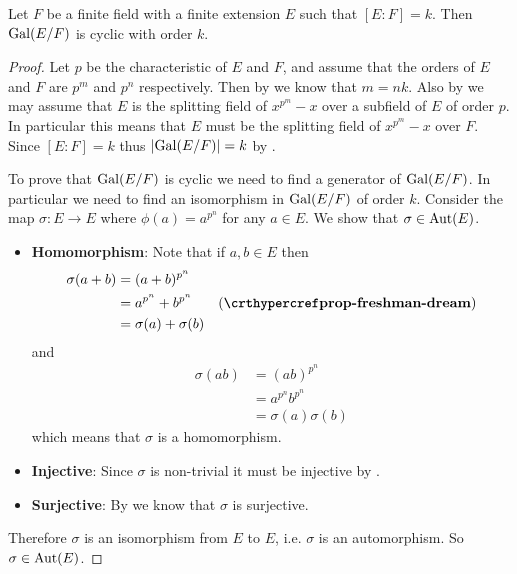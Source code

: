 \begin{corollary}
    Let $F$ be a finite field with a finite extension $E$ such that $[E:F] = k$. Then $\mathrm{Gal}(E/F)$ is cyclic with order $k$.
\end{corollary}
\begin{proof}
    Let $p$ be the characteristic of $E$ and $F$, and assume that the orders of $E$ and $F$ are $p^m$ and $p^n$ respectively. Then by  we know that $m = nk$. Also by  we may assume that $E$ is the splitting field of $x^{p^m} - x$ over a subfield of $E$ of order $p$. In particular this means that $E$ must be the splitting field of $x^{p^m} - x$ over $F$. Since $[E:F] = k$ thus $|\mathrm{Gal}(E/F)| = k$ by .

    To prove that $\mathrm{Gal}(E/F)$ is cyclic we need to find a generator of $\mathrm{Gal}(E/F)$. In particular we need to find an isomorphism in $\mathrm{Gal}(E/F)$ of order $k$. Consider the map $\sigma: E \to E$ where $\phi(a) = a^{p^n}$ for any $a \in E$. We show that $\sigma \in \mathrm{Aut}(E)$.
    \begin{itemize}
        \item \textbf{Homomorphism}: Note that if $a, b \in E$ then
        \begin{align*}
            \sigma(a+b) &= (a+b)^{p^n}\\
            &= a^{p^n} + b^{p^n} & (\myref{prop-freshman-dream})\\
            &= \sigma(a) + \sigma(b)
        \end{align*}
        and
        \begin{align*}
            \sigma(ab) &= (ab)^{p^n}\\
            &= a^{p^n}b^{p^n}\\
            &= \sigma(a)\sigma(b)
        \end{align*}
        which means that $\sigma$ is a homomorphism.
        
        \item \textbf{Injective}: Since $\sigma$ is non-trivial it must be injective by .
        
        \item \textbf{Surjective}: By  we know that $\sigma$ is surjective.
    \end{itemize}
    Therefore $\sigma$ is an isomorphism from $E$ to $E$, i.e. $\sigma$ is an automorphism. So $\sigma \in \mathrm{Aut}(E)$.
    

\end{proof}
